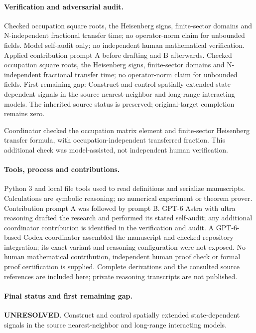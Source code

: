 \documentclass[11pt]{article}
\begin{document}
\paragraph{Verification and adversarial audit.}
Checked occupation square roots, the Heisenberg signs, finite-sector domains and N-independent fractional transfer time; no operator-norm claim for unbounded fields. Model self-audit only; no independent human mathematical verification. Applied contribution prompt A before drafting and B afterwards. Checked occupation square roots, the Heisenberg signs, finite-sector domains and N-independent fractional transfer time; no operator-norm claim for unbounded fields. First remaining gap: Construct and control spatially extended state-dependent signals in the source nearest-neighbor and long-range interacting models. The inherited source status is preserved; original-target completion remains zero.

Coordinator checked the occupation matrix element and finite-sector Heisenberg transfer formula, with occupation-independent transferred fraction. This additional check was model-assisted, not independent human verification.

\paragraph{Tools, process and contributions.}
Python 3 and local file tools used to read definitions and serialize manuscripts. Calculations are symbolic reasoning; no numerical experiment or theorem prover. Contribution prompt A was followed by prompt B. GPT-6 Astra with ultra reasoning drafted the research and performed its stated self-audit; any additional coordinator contribution is identified in the verification and audit. A GPT-6-based Codex coordinator assembled the manuscript and checked repository integration; its exact variant and reasoning configuration were not exposed. No human mathematical contribution, independent human proof check or formal proof certification is supplied. Complete derivations and the consulted source references are included here; private reasoning transcripts are not published.

\paragraph{Final status and first remaining gap.}
\textbf{UNRESOLVED}. Construct and control spatially extended state-dependent signals in the source nearest-neighbor and long-range interacting models.
\end{document}
